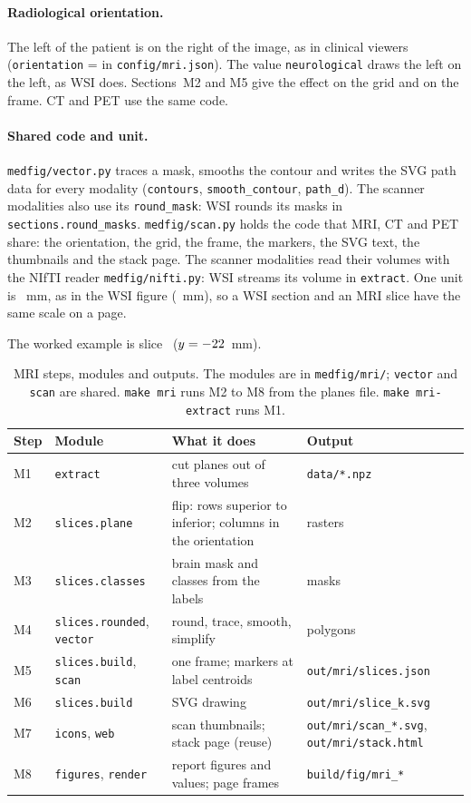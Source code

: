 \documentclass[10pt,a4paper]{article}
\newcommand{\code}[1]{\texttt{#1}}
\begin{document}
\paragraph{Radiological orientation.} The left of the patient is on the right of the image, as in clinical viewers
(\code{orientation} = \mOrientation{} in \code{config/mri.json}). The value \code{neurological} draws the left on the left,
as WSI does. Sections~M2 and M5 give the effect on the grid and on the frame. CT and PET use the same code.

\paragraph{Shared code and unit.} \code{medfig/vector.py} traces a mask, smooths the contour and writes the SVG path data for
every modality (\code{contours}, \code{smooth\_contour}, \code{path\_d}). The scanner modalities also use its
\code{round\_mask}: WSI rounds its masks in \code{sections.round\_masks}. \code{medfig/scan.py} holds the code that MRI, CT and
PET share: the orientation, the grid, the frame, the markers, the SVG text, the thumbnails and the stack page. The scanner
modalities read their volumes with the NIfTI reader \code{medfig/nifti.py}: WSI streams its volume in \code{extract}.
One unit is \mUnit~mm, as in the WSI figure (\vMmPerUnit~mm), so a WSI section and an MRI slice have the same scale on a page.

\medskip\noindent The worked example is slice~\mExampleK{} ($y=-22$~mm).

\begin{table}[H]\centering\small
\begin{tabularx}{\linewidth}{@{}l l >{\raggedright\arraybackslash}X >{\raggedright\arraybackslash}p{3.7cm}@{}}\toprule
Step & Module & What it does & Output\\\midrule
M1 & \code{extract} & cut planes out of three volumes & \code{data/*.npz}\\
M2 & \code{slices.plane} & flip: rows superior to inferior; columns in the orientation & rasters\\
M3 & \code{slices.classes} & brain mask and classes from the labels & masks\\
M4 & \code{slices.rounded}, \code{vector} & round, trace, smooth, simplify & polygons\\
M5 & \code{slices.build}, \code{scan} & one frame; markers at label centroids & \code{out/mri/slices.json}\\
M6 & \code{slices.build} & SVG drawing & \code{out/mri/slice\_k.svg}\\
M7 & \code{icons}, \code{web} & scan thumbnails; stack page (reuse) & \code{out/mri/scan\_*.svg}, \code{out/mri/stack.html}\\
M8 & \code{figures}, \code{render} & report figures and values; page frames & \code{build/fig/mri\_*}\\\bottomrule
\end{tabularx}
\caption{MRI steps, modules and outputs. The modules are in \code{medfig/mri/}; \code{vector} and \code{scan} are shared.
\code{make mri} runs M2 to M8 from the planes file. \code{make mri-extract} runs M1.}\label{t:msteps}
\end{table}
\end{document}
